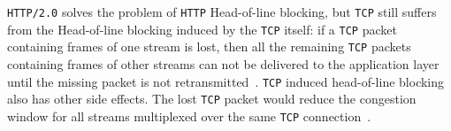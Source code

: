 \documentclass[12pt,a4paper]{report}
\begin{document}
    
    
    
    


\texttt{HTTP/2.0} solves the problem of \texttt{HTTP} Head-of-line blocking, but \texttt{TCP} still suffers from the Head-of-line blocking induced by the \texttt{TCP} itself: if a \texttt{TCP} packet containing frames of one stream is lost, then all the remaining \texttt{TCP} packets containing frames of other streams can not be delivered to the application layer until the missing packet is not retransmitted~\cite{bib_making_web_faster_with_http2, bib_TCP_Head_of_line_blocking_stackoverflow, How-does-HTTP-2-solve-the-Head-of-Line-blocking-HOL-issue}.
\texttt{TCP} induced head-of-line blocking also has other side effects.
The lost \texttt{TCP} packet would reduce the congestion window for all streams multiplexed over the same \texttt{TCP} connection~\cite{HTTP_over_UDP_An_Experimental_Investigation_of_QUIC}.



\end{document}
